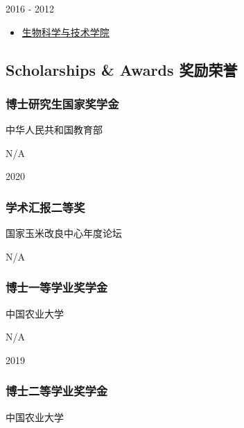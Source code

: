 \documentclass[]{article}
\providecommand{\tightlist}{%
  \setlength{\itemsep}{0pt}\setlength{\parskip}{0pt}}
\begin{document}
2016 - 2012

\begin{itemize}
\tightlist
\item
  \href{http://biology.bjfu.edu.cn/}{生物科学与技术学院}
\end{itemize}

\hypertarget{scholarships-awards-ux5956ux52b1ux8363ux8a89}{%
\subsection{Scholarships \& Awards
奖励荣誉}\label{scholarships-awards-ux5956ux52b1ux8363ux8a89}}

\hypertarget{ux535aux58ebux7814ux7a76ux751fux56fdux5bb6ux5956ux5b66ux91d1}{%
\subsubsection{博士研究生国家奖学金}\label{ux535aux58ebux7814ux7a76ux751fux56fdux5bb6ux5956ux5b66ux91d1}}

中华人民共和国教育部

N/A

2020

\hypertarget{ux5b66ux672fux6c47ux62a5ux4e8cux7b49ux5956}{%
\subsubsection{学术汇报二等奖}\label{ux5b66ux672fux6c47ux62a5ux4e8cux7b49ux5956}}

国家玉米改良中心年度论坛

N/A

\hypertarget{ux535aux58ebux4e00ux7b49ux5b66ux4e1aux5956ux5b66ux91d1}{%
\subsubsection{博士一等学业奖学金}\label{ux535aux58ebux4e00ux7b49ux5b66ux4e1aux5956ux5b66ux91d1}}

中国农业大学

N/A

2019

\hypertarget{ux535aux58ebux4e8cux7b49ux5b66ux4e1aux5956ux5b66ux91d1}{%
\subsubsection{博士二等学业奖学金}\label{ux535aux58ebux4e8cux7b49ux5b66ux4e1aux5956ux5b66ux91d1}}

中国农业大学
\end{document}
